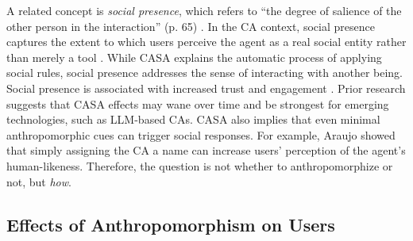 \documentclass[sigconf,review,anonymous]{acmart}
\begin{document}
A related concept is \textit{social presence}, which refers to ``the degree of salience of the other person in the interaction'' (p. 65) \citep{short1976social}. In the CA context, social presence captures the extent to which users perceive the agent as a real social entity rather than merely a tool \citep{oh2018systematic}. While CASA explains the automatic process of applying social rules, social presence addresses the sense of interacting with another being. Social presence is associated with increased trust and engagement \citep{gunawardena1995social}. Prior research \cite{gambino2020building,koger2023casa} %
suggests that CASA effects may wane over time and be strongest for emerging technologies, such as LLM-based CAs. CASA also implies that even minimal anthropomorphic cues can trigger social responses. For example, Araujo \cite{araujo2018living} showed that simply assigning the CA a name can increase users' perception of the agent's human-likeness. Therefore, the question is not whether to anthropomorphize or not, but \textit{how}.  %




\subsection{Effects of Anthropomorphism on Users}
\end{document}
